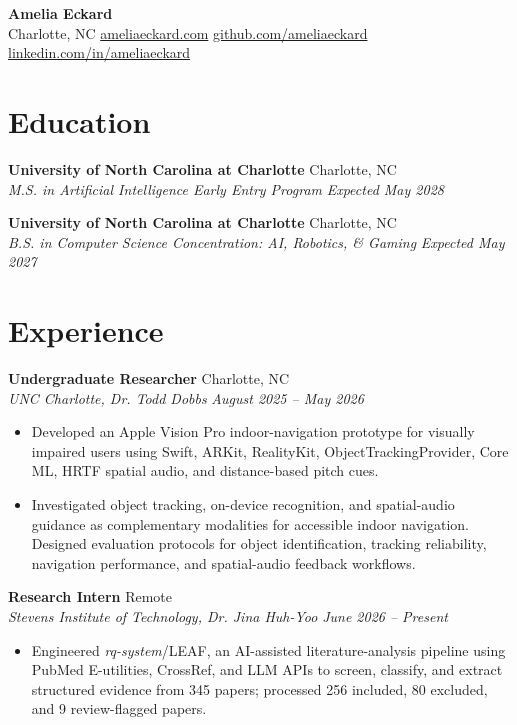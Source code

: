 \documentclass[letterpaper,10pt]{article}
\newcommand{\resumeentry}[4]{
  \noindent\textbf{#1} \hfill #2 \\
  \textit{#3} \hfill \textit{#4}
}
\begin{document}
\begin{center}
  {\Large\textbf{Amelia Eckard}} \\[3pt]
  Charlotte, NC \textbar{}
  \href{https://ameliaeckard.com}{ameliaeckard.com} \textbar{}
  \href{https://github.com/ameliaeckard}{github.com/ameliaeckard} \textbar{}
  \href{https://linkedin.com/in/ameliaeckard}{linkedin.com/in/ameliaeckard}
\end{center}

\section{Education}

\resumeentry
  {University of North Carolina at Charlotte}{Charlotte, NC}
  {M.S. in Artificial Intelligence \textbar{} Early Entry Program}{Expected May 2028}

\smallskip

\resumeentry
  {University of North Carolina at Charlotte}{Charlotte, NC}
  {B.S. in Computer Science \textbar{} Concentration: AI, Robotics, \& Gaming}{Expected May 2027}

\section{Experience}

\resumeentry
  {Undergraduate Researcher}{Charlotte, NC}
  {UNC Charlotte, Dr. Todd Dobbs}{August 2025 -- May 2026}
\begin{itemize}
  \item Developed an Apple Vision Pro indoor-navigation prototype for visually impaired users using Swift, ARKit, RealityKit, ObjectTrackingProvider, Core ML, HRTF spatial audio, and distance-based pitch cues.
  \item Investigated object tracking, on-device recognition, and spatial-audio guidance as complementary modalities for accessible indoor navigation. Designed evaluation protocols for object identification, tracking reliability, navigation performance, and spatial-audio feedback workflows.
\end{itemize}

\smallskip

\resumeentry
  {Research Intern}{Remote}
  {Stevens Institute of Technology, Dr. Jina Huh-Yoo}{June 2026 -- Present}
\begin{itemize}
  \item Engineered \textit{rq-system}/LEAF, an AI-assisted literature-analysis pipeline using PubMed E-utilities, CrossRef, and LLM APIs to screen, classify, and extract structured evidence from 345 papers; processed 256 included, 80 excluded, and 9 review-flagged papers.
\end{itemize}
\end{document}
